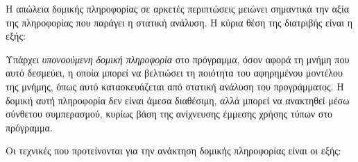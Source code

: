 Η απώλεια δομικής πληροφορίας σε αρκετές περιπτώσεις μειώνει σημαντικά
την αξία της πληροφορίας που παράγει η στατική ανάλυση. Η κύρια θέση
της διατριβής είναι η εξής:

\begin{displayquote}
  Υπάρχει \emph{υπονοούμενη δομική πληροφορία} στο πρόγραμμα, όσον
  αφορά τη μνήμη που αυτό δεσμεύει, η οποία μπορεί να βελτιώσει τη
  ποιότητα του αφηρημένου μοντέλου της μνήμης, όπως αυτό
  κατασκευάζεται από στατική ανάλυση του προγράμματος. Η δομική αυτή
  πληροφορία δεν είναι άμεσα διαθέσιμη, αλλά μπορεί να ανακτηθεί μέσω
  σύνθετου συμπερασμού, κυρίως βάση της ανίχνευσης έμμεσης χρήσης
  τύπων στο πρόγραμμα.
\end{displayquote}


Οι τεχνικές που προτείνονται για την ανάκτηση δομικής πληροφορίας
είναι οι εξής:
